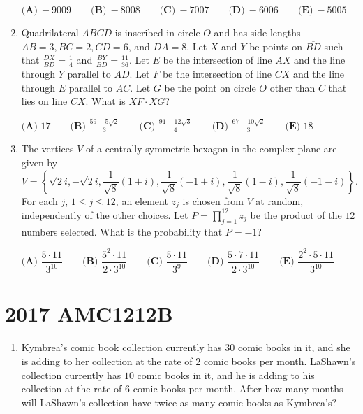 \documentclass{article}
\begin{document}
\begin{enumerate}[label=\arabic*., itemsep=0.5em]
\(\textbf{(A)}\ -9009 \qquad\textbf{(B)}\ -8008 \qquad\textbf{(C)}\ -7007 \qquad\textbf{(D)}\ -6006 \qquad\textbf{(E)}\ -5005\)\par \vspace{0.5em}\item Quadrilateral \(ABCD\) is inscribed in circle \(O\) and has side lengths \(AB=3, BC=2, CD=6\), and \(DA=8\). Let \(X\) and \(Y\) be points on \(\overline{BD}\) such that \(\frac{DX}{BD} = \frac{1}{4}\) and \(\frac{BY}{BD} = \frac{11}{36}\). Let \(E\) be the intersection of line \(AX\) and the line through \(Y\) parallel to \(\overline{AD}\). Let \(F\) be the intersection of line \(CX\) and the line through \(E\) parallel to \(\overline{AC}\). Let \(G\) be the point on circle \(O\) other than \(C\) that lies on line \(CX\). What is \(XF\cdot XG\)?

\(\textbf{(A) }17\qquad\textbf{(B) }\frac{59 - 5\sqrt{2}}{3}\qquad\textbf{(C) }\frac{91 - 12\sqrt{3}}{4}\qquad\textbf{(D) }\frac{67 - 10\sqrt{2}}{3}\qquad\textbf{(E) }18\)\par \vspace{0.5em}\item The vertices \(V\) of a centrally symmetric hexagon in the complex plane are given by 
\begin{equation*}
V=\left\{   \sqrt{2}i,-\sqrt{2}i, \frac{1}{\sqrt{8}}(1+i),\frac{1}{\sqrt{8}}(-1+i),\frac{1}{\sqrt{8}}(1-i),\frac{1}{\sqrt{8}}(-1-i) \right\}.
\end{equation*}
 For each \(j\), \(1\leq j\leq 12\), an element \(z_j\) is chosen from \(V\) at random, independently of the other choices. Let \(P={\prod}_{j=1}^{12}z_j\) be the product of the \(12\) numbers selected. What is the probability that \(P=-1\)?

\(\textbf{(A) } \dfrac{5\cdot11}{3^{10}} \qquad \textbf{(B) } \dfrac{5^2\cdot11}{2\cdot3^{10}} \qquad \textbf{(C) } \dfrac{5\cdot11}{3^{9}} \qquad \textbf{(D) } \dfrac{5\cdot7\cdot11}{2\cdot3^{10}} \qquad \textbf{(E) } \dfrac{2^2\cdot5\cdot11}{3^{10}}\)\par \vspace{0.5em}\end{enumerate}\newpage\section*{2017 AMC1212B}\begin{enumerate}[label=\arabic*., itemsep=0.5em]\item Kymbrea's comic book collection currently has \(30\) comic books in it, and she is adding to her collection at the rate of \(2\) comic books per month. LaShawn's collection currently has \(10\) comic books in it, and he is adding to his collection at the rate of \(6\) comic books per month. After how many months will LaShawn's collection have twice as many comic books as Kymbrea's?


\end{enumerate}
\end{document}
